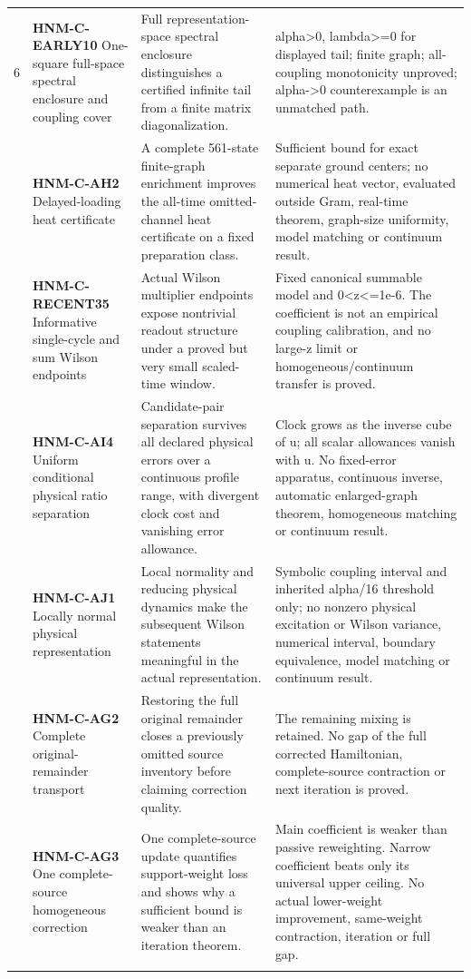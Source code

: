 \begin{longtable}{@{}p{8mm}p{44mm}p{53mm}p{43mm}@{}}
6 & \textbf{HNM-C-EARLY10} One-square full-space spectral enclosure and coupling cover & Full representation-space spectral enclosure distinguishes a certified infinite tail from a finite matrix diagonalization. & alpha>0, lambda>=0 for displayed tail; finite graph; all-coupling monotonicity unproved; alpha->0 counterexample is an unmatched path.\\\addlinespace
7 & \textbf{HNM-C-AH2} Delayed-loading heat certificate & A complete 561-state finite-graph enrichment improves the all-time omitted-channel heat certificate on a fixed preparation class. & Sufficient bound for exact separate ground centers; no numerical heat vector, evaluated outside Gram, real-time theorem, graph-size uniformity, model matching or continuum result.\\\addlinespace
8 & \textbf{HNM-C-RECENT35} Informative single-cycle and sum Wilson endpoints & Actual Wilson multiplier endpoints expose nontrivial readout structure under a proved but very small scaled-time window. & Fixed canonical summable model and 0<z<=1e-6. The coefficient is not an empirical coupling calibration, and no large-z limit or homogeneous/continuum transfer is proved.\\\addlinespace
9 & \textbf{HNM-C-AI4} Uniform conditional physical ratio separation & Candidate-pair separation survives all declared physical errors over a continuous profile range, with divergent clock cost and vanishing error allowance. & Clock grows as the inverse cube of u; all scalar allowances vanish with u. No fixed-error apparatus, continuous inverse, automatic enlarged-graph theorem, homogeneous matching or continuum result.\\\addlinespace
10 & \textbf{HNM-C-AJ1} Locally normal physical representation & Local normality and reducing physical dynamics make the subsequent Wilson statements meaningful in the actual representation. & Symbolic coupling interval and inherited alpha/16 threshold only; no nonzero physical excitation or Wilson variance, numerical interval, boundary equivalence, model matching or continuum result.\\\addlinespace
11 & \textbf{HNM-C-AG2} Complete original-remainder transport & Restoring the full original remainder closes a previously omitted source inventory before claiming correction quality. & The remaining mixing is retained. No gap of the full corrected Hamiltonian, complete-source contraction or next iteration is proved.\\\addlinespace
12 & \textbf{HNM-C-AG3} One complete-source homogeneous correction & One complete-source update quantifies support-weight loss and shows why a sufficient bound is weaker than an iteration theorem. & Main coefficient is weaker than passive reweighting. Narrow coefficient beats only its universal upper ceiling. No actual lower-weight improvement, same-weight contraction, iteration or full gap.\\\addlinespace

\end{longtable}
